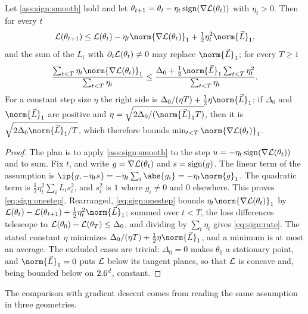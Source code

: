 \begin{refsection}
\begin{theorem}\label{thm:sign:descent}
Let \cref{ass:sign:smooth} hold and let $\theta_{t+1}=\theta_t-\eta_t\operatorname{sign}(\nabla\mathcal{L}(\theta_t))$ with $\eta_t>0$. Then for every $t$
\begin{equation}\label{eq:sign:onestep}
  \Loss(\theta_{t+1})\le\Loss(\theta_t)-\eta_t\norm{\nabla\Loss(\theta_t)}_1+\tfrac12\eta_t^2\norm{\vec L}_1,
\end{equation}
and the sum of the $L_i$ with $\partial_i\mathcal{L}(\theta_t)\ne0$ may replace $\norm{\vec L}_1$; for every $T\ge1$
\begin{equation}\label{eq:sign:rate}
  \frac{\sum_{t<T}\eta_t\norm{\nabla\Loss(\theta_t)}_1}{\sum_{t<T}\eta_t}\le\frac{\Delta_0+\frac12\norm{\vec L}_1\sum_{t<T}\eta_t^2}{\sum_{t<T}\eta_t}.
\end{equation}
For a constant step size $\eta$ the right side is $\Delta_0/(\eta T)+\frac12\eta\norm{\vec L}_1$; if $\Delta_0$ and $\norm{\vec L}_1$ are positive and $\eta=\sqrt{2\Delta_0/(\norm{\vec L}_1T)}$, then it is $\sqrt{2\Delta_0\norm{\vec L}_1/T}$, which therefore bounds $\min_{t<T}\norm{\nabla\Loss(\theta_t)}_1$.
\end{theorem}

\begin{proof}
The plan is to apply \cref{ass:sign:smooth} to the step $u=-\eta_t\operatorname{sign}(\nabla\mathcal{L}(\theta_t))$ and to sum. Fix $t$, and write $g=\nabla\mathcal{L}(\theta_t)$ and $s=\operatorname{sign}(g)$. The linear term of the assumption is $\ip{g,-\eta_ts}=-\eta_t\sum_i\abs{g_i}=-\eta_t\norm{g}_1$. The quadratic term is $\frac12\eta_t^2\sum_iL_is_i^2$, and $s_i^2$ is $1$ where $g_i\ne0$ and $0$ elsewhere. This proves \eqref{eq:sign:onestep}. Rearranged, \eqref{eq:sign:onestep} bounds $\eta_t\norm{\nabla\Loss(\theta_t)}_1$ by $\Loss(\theta_t)-\Loss(\theta_{t+1})+\frac12\eta_t^2\norm{\vec L}_1$; summed over $t<T$, the loss differences telescope to $\mathcal{L}(\theta_0)-\mathcal{L}(\theta_T)\le\Delta_0$, and dividing by $\sum_t\eta_t$ gives \eqref{eq:sign:rate}. The stated constant $\eta$ minimizes $\Delta_0/(\eta T)+\frac12\eta\norm{\vec L}_1$, and a minimum is at most an average. The excluded cases are trivial: $\Delta_0=0$ makes $\theta_0$ a stationary point, and $\norm{\vec L}_1=0$ puts $\mathcal{L}$ below its tangent planes, so that $\mathcal{L}$ is concave and, being bounded below on $2.6^d$, constant.
\end{proof}

The comparison with gradient descent comes from reading the same assumption in three geometries.


\end{refsection}
